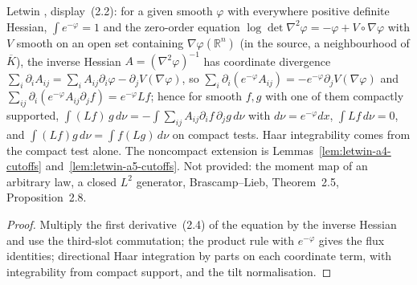 \begin{lemma}
  \label{lem:letwin-inverse-hessian-ibp}
  \leanok
  Letwin \cite{Letwin2026QuadraticKLS}, display~(2.2): for a given smooth $\varphi$ with everywhere
  positive definite Hessian, $\int e^{-\varphi}=1$ and the zero-order equation
  $\log\det\nabla^2\varphi=-\varphi+V\circ\nabla\varphi$ with $V$ smooth on an open set containing
  $\nabla\varphi(\mathbb R^n)$ (in the source, a neighbourhood of $\overline K$), the inverse Hessian
  $A=(\nabla^2\varphi)^{-1}$ has coordinate divergence $\sum_i\partial_iA_{ij}=\sum_iA_{ij}\partial_i\varphi
  -\partial_jV(\nabla\varphi)$, so $\sum_i\partial_i(e^{-\varphi}A_{ij})=-e^{-\varphi}\partial_jV(\nabla\varphi)$
  and $\sum_{ij}\partial_i(e^{-\varphi}A_{ij}\partial_jf)=e^{-\varphi}Lf$; hence for smooth $f,g$ with one of
  them compactly supported, $\int(Lf)\,g\,d\nu=-\int\sum_{ij}A_{ij}\partial_if\,\partial_jg\,d\nu$ with
  $d\nu=e^{-\varphi}dx$, $\int Lf\,d\nu=0$, and $\int(Lf)g\,d\nu=\int f(Lg)\,d\nu$ on compact tests.  Haar
  integrability comes from the compact test alone.  The noncompact extension is
  Lemmas~\ref{lem:letwin-a4-cutoffs} and~\ref{lem:letwin-a5-cutoffs}.  Not provided: the moment map of an arbitrary law,
  a closed $L^2$ generator, Brascamp--Lieb, Theorem~2.5, Proposition~2.8.
\end{lemma}
\begin{proof}
  \leanok
  Multiply the first derivative~(2.4) of the equation by the inverse Hessian and use the third-slot
  commutation; the product rule with $e^{-\varphi}$ gives the flux identities; directional Haar
  integration by parts on each coordinate term, with integrability from compact support, and the tilt
  normalisation.
\end{proof}

